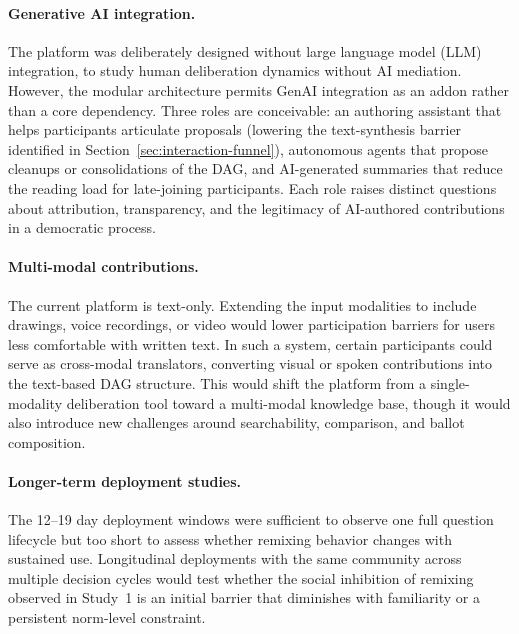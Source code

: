 \documentclass[a4paper, 12pt, twoside]{iviathesis}
\begin{document}
\paragraph{Generative AI integration.}
The platform was deliberately designed without large language model (LLM) integration, to study human deliberation dynamics without AI mediation. However, the modular architecture permits GenAI integration as an addon rather than a core dependency. Three roles are conceivable: an authoring assistant that helps participants articulate proposals (lowering the text-synthesis barrier identified in Section~\ref{sec:interaction-funnel}), autonomous agents that propose cleanups or consolidations of the DAG, and AI-generated summaries that reduce the reading load for late-joining participants. Each role raises distinct questions about attribution, transparency, and the legitimacy of AI-authored contributions in a democratic process.

\paragraph{Multi-modal contributions.}
The current platform is text-only. Extending the input modalities to include drawings, voice recordings, or video would lower participation barriers for users less comfortable with written text. In such a system, certain participants could serve as cross-modal translators, converting visual or spoken contributions into the text-based DAG structure. This would shift the platform from a single-modality deliberation tool toward a multi-modal knowledge base, though it would also introduce new challenges around searchability, comparison, and ballot composition.

\paragraph{Longer-term deployment studies.}
The 12--19 day deployment windows were sufficient to observe one full question lifecycle but too short to assess whether remixing behavior changes with sustained use. Longitudinal deployments with the same community across multiple decision cycles would test whether the social inhibition of remixing observed in Study~1 is an initial barrier that diminishes with familiarity or a persistent norm-level constraint.
\end{document}
